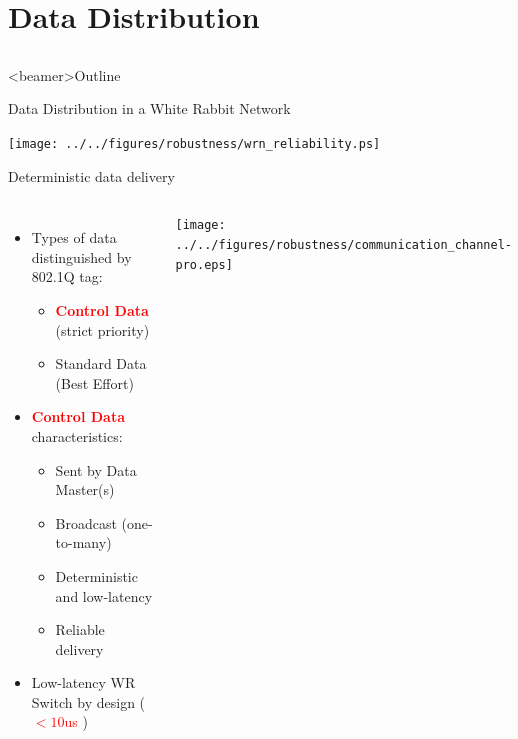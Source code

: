 \documentclass[compress,red]{beamer}
\begin{document}
\section{Data Distribution}
\subsection{}
\begin{frame}<beamer>{Outline}
    \tableofcontents [currentsection]
\end{frame}

\begin{frame}{Data Distribution in a White Rabbit Network }

    \vspace{-0.3cm}

    \begin{center}
    \texttt{[image: ../../figures/robustness/wrn\_reliability.ps]}
    \end{center}
	  
    \vspace{-0.7cm}

\end{frame}

\begin{frame}{Deterministic data delivery}

\begin{columns}[c]
    \begin{itemize}
      \item Types of data distinguished by 802.1Q tag:
	  \begin{itemize}
	    \item \textcolor{red}{\bf Control Data} (strict priority)
	    \item Standard Data (Best Effort)
	  \end{itemize}
	  \item \textcolor{red}{\bf Control Data} characteristics:
	  \begin{itemize}
      \item Sent by Data Master(s)
	    \item Broadcast (one-to-many)
	    \item Deterministic and low-latency
	    \item Reliable delivery
	  \end{itemize}
    \item Low-latency WR Switch by design ( \textcolor{red}{$<10$us} )
    \end{itemize}
    \begin{center}
    \texttt{[image: ../../figures/robustness/communication\_channel-pro.eps]}
    \end{center}

\end{columns}
\end{frame}
\end{document}

